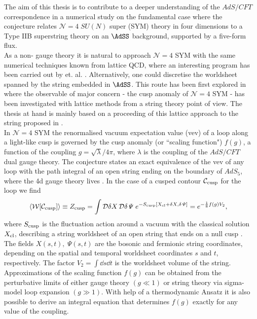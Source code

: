 The aim of this thesis is to contribute to a deeper understanding of the $AdS/CFT$ correspondence in a numerical study on the fundamental case where the conjecture relates $\mathcal{N}=4\; SU(N)$ super  (SYM) theory in four dimensions to a Type IIB superstring theory on an $\AdSS$ background, supported by a  five-form flux.\\
As a non- gauge theory it is natural to approach $\mathcal{N}=4$ SYM with the same numerical techniques known from lattice QCD, where an interesting program has been carried out by  et. al. \cite{Catterall_physrept, Bergner:2016sbv}. Alternatively, one could discretise the worldsheet spanned by the  string embedded in $\AdSS$. This route has been first explored in \cite{Roiban} where the observable of major concern - the cusp anomaly of $\mathcal{N}=4$ SYM - has been investigated with lattice methods from a string theory point of view. The thesis at hand is mainly based on a proceeding of this lattice approach to the  string  proposed in \cite{Bianchi:2016cyv,Forini:2016sot}. \\[0.5cm]
%
%
In $\mathcal{N}=4$ SYM the renormalised vacuum expectation value (vev) of a  loop along a light-like cusp is governed by the cusp anomaly (or ``scaling function") $f(g)$, a function of the coupling $g=\sqrt{\lambda}/4\pi$, where $\lambda$ is the  coupling of the $AdS/CFT$ dual gauge theory. The  conjecture states an exact equivalence of the vev of any  loop with the path integral of an open string ending on the boundary of $AdS_{5}$, where the 4d gauge theory lives \cite{maldacena2}. In the case of a cusped contour $\mathcal{C}_{\rm cusp}$ for the  loop we find
%
%
\begin{equation}
\langle \mathcal{W}[\mathcal{C}_{\rm cusp}] \rangle \equiv Z_{\rm cusp} = \int \mathcal{D}\delta X\,\mathcal{D}\delta\mathit{\Psi} \; e^{-S_{\rm cusp}[X_{\rm cl}+\delta X, \delta\mathit{\Psi} ]  } = e^{-\frac{1}{8}f(g) V_{2}},
\label{eq: intro_W_cusp}
\end{equation}
%
%
where $S_{\rm cusp}$ is the fluctuation action around a vacuum with the classical solution $X_{\rm cl}$, describing a string worldsheet of an open string that ends on a null cusp \cite{Giombi:2009gd}. The fields $X(s,t),\;\mathit{\Psi}(s,t)$ are the bosonic and fermionic string coordinates, depending on the spatial and temporal worldsheet coordinates $s$ and $t$, respectively. The factor $V_{2}=\int \dd s \dd t$ is the worldsheet volume of the string. Approximations of the scaling function $f(g)$ can be obtained from the perturbative limits of either gauge theory \cite{Bern:2006ew} $(g \ll 1)$ or string theory via sigma-model loop expansion \cite{Giombi:2009gd,Gubser:2002tv,Frolov:2002av} $(g \gg 1)$. With help of a thermodynamic  Ansatz it is also possible to derive an integral equation \cite{Beisert:2006ez} that determines $f(g)$ exactly for any value of the coupling.\\[0.5cm]

